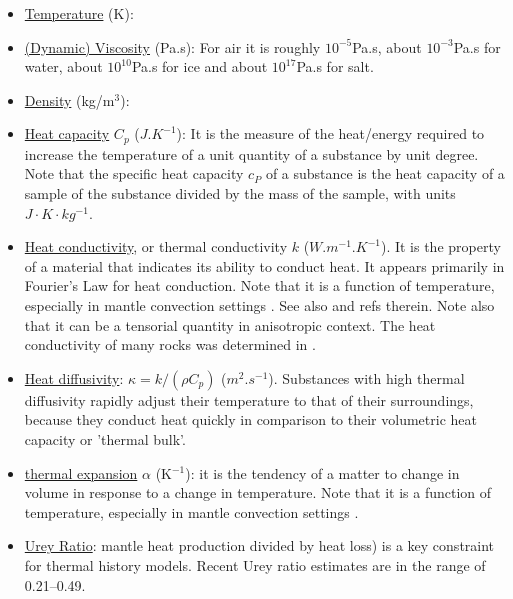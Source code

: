 \begin{itemize}

\Literature \cite{hohr87}
 
\item \underline{Temperature} (K):
\item \underline{(Dynamic) Viscosity} (Pa.s): For air it is roughly $10^{-5}$Pa.s, about $10^{-3}$Pa.s for water, about $10^{10}$Pa.s for ice and about $10^{17}$Pa.s for salt. 



\item \underline{Density} (kg/m$^3$):
\item \underline{Heat capacity} $C_p$ ($J.K^{-1}$): 
It is the measure of the heat/energy required to increase the 
temperature of a unit quantity of a substance by unit degree. Note that the specific heat capacity $c_P$ of a 
substance is the heat capacity of a sample of the substance divided by the mass of the sample, with units $J\cdot K\cdot kg^{-1}$.

\item \underline{Heat conductivity}, or thermal conductivity $k$ ($W.m^{-1}.K^{-1}$). It is the 
property of a material that indicates its ability to conduct heat. It appears primarily in 
Fourier's Law for heat conduction.
Note that it is a function of temperature, especially in mantle convection settings \cite{mika13}. 
See also \cite{boca99} and refs therein. Note also that it can be a tensorial quantity in 
anisotropic context.
The heat conductivity of many rocks was determined in \cite{ando13}.

\item \underline{Heat diffusivity}: $\kappa=k/(\rho C_p)$ ($m^2.s^{-1}$). Substances with high thermal diffusivity rapidly adjust their temperature to that of their surroundings, because they 
conduct heat quickly in comparison to their volumetric heat capacity or 'thermal bulk'.
\item \underline{thermal expansion} $\alpha$ (K$^{-1}$): it is the tendency of a matter to change in volume in response to a change in temperature. Note that it is a function of temperature, especially in mantle convection settings \cite{mika13}.

\item \underline{Urey Ratio}: mantle heat production divided by heat loss) is a key constraint for thermal history models. Recent Urey ratio estimates are in the range of 0.21–0.49. \cite{lecm11}


\end{itemize}
